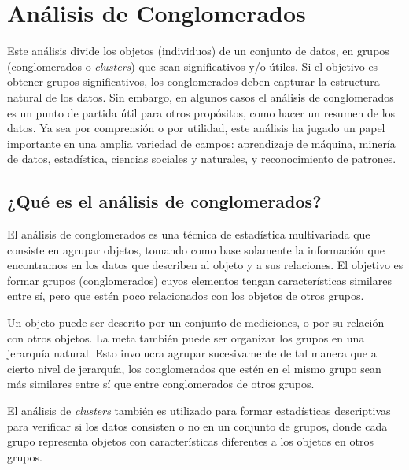 


\chapter{Análisis de Conglomerados}

Este análisis divide los objetos (individuos) de un conjunto de datos, en grupos (conglomerados o \textit{clusters}) que sean significativos y/o útiles.
Si el objetivo es obtener grupos significativos,  los conglomerados deben capturar la estructura natural de los datos. Sin embargo, en algunos casos el análisis de conglomerados es un punto de partida útil para otros propósitos, como hacer un resumen de los datos. Ya sea por comprensión o por utilidad, este análisis ha jugado un papel importante en una amplia variedad de campos: aprendizaje de máquina, minería de datos, estadística, ciencias sociales y naturales, y reconocimiento de patrones.

\section{¿Qué es el análisis de conglomerados?}
El análisis de conglomerados es una técnica de estadística multivariada que consiste en agrupar objetos, tomando como base solamente la información que encontramos en los datos que describen al objeto y a sus relaciones. El objetivo es formar grupos (conglomerados) cuyos elementos tengan características similares entre sí, pero que estén poco relacionados con los objetos de otros grupos.  

Un objeto puede ser descrito por un conjunto de mediciones, o por su relación con otros objetos. La meta también puede ser organizar los grupos en una jerarquía natural. Esto involucra agrupar sucesivamente de tal manera que a cierto nivel de jerarquía, los conglomerados que estén en el mismo grupo sean más similares entre sí que entre conglomerados de otros grupos.

El análisis de \textit{clusters} también es utilizado para formar estadísticas descriptivas para verificar si los datos consisten o no en un conjunto de grupos, donde cada grupo representa objetos con características diferentes a los objetos en otros grupos.

